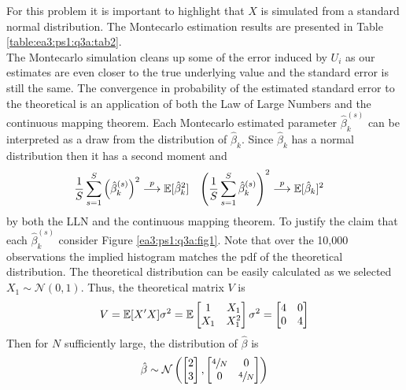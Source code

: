 \documentclass{article}
\begin{document}
\begin{solution}
For this problem it is important to highlight that $X$ is simulated from a standard normal distribution. The Montecarlo estimation results are presented in Table \ref{table:ea3:ps1:q3a:tab2}. 
 \\ 
The Montecarlo simulation cleans up some of the error induced by $U_i$ as our estimates are even closer to the true underlying value and the standard error is still the same. The convergence in probability of the estimated standard error to the theoretical is an application of both the Law of Large Numbers and the continuous mapping theorem. Each Montecarlo estimated parameter $\hat{\beta}_k^{(s)}$ can be interpreted as a draw from the distribution of $\hat{\beta}_k$. Since $\hat{\beta}_k$ has a normal distribution then it has a second moment and 
\begin{align*}
    \frac{1}{S} \sum_{s=1}^{S}\left(\hat{\beta}_{k}^{(s)}\right)^{2}&\stackrel{p}{\longrightarrow}  \mathbb{E}[\hat{\beta}_k^2] & 
    \left(\frac{1}{S} \sum_{s=1}^{S} \hat{\beta}_{k}^{(s)}\right)^{2}&\stackrel{p}{\longrightarrow} \mathbb{E}[\hat{\beta}_k]^2
\end{align*}
by both the LLN and the continuous mapping theorem. To justify the claim that each $\hat{\beta}_k^{(s)}$ consider Figure \ref{ea3:ps1:q3a:fig1}. Note that over the 10,000 observations the implied histogram matches the pdf of the theoretical distribution. The theoretical distribution can be easily calculated as we selected $X_1\sim\mathcal{N}(0,1)$. Thus, the theoretical matrix $V$ is 
\begin{equation*}
    V = \mathbb{E}[X'X]\sigma^2 = \mathbb{E}\begin{bmatrix}
    1 & X_1 \\ X_1 & X_1^2
    \end{bmatrix}\sigma^2 = 
    \begin{bmatrix}
    4 & 0 \\ 0 & 4
    \end{bmatrix} 
\end{equation*}
Then for $N$ sufficiently large, the distribution of $\hat{\beta}$ is 
\begin{equation*}
    \hat{\beta}\sim\mathcal{N}\left(\begin{bmatrix}
    2 \\ 3
    \end{bmatrix},\begin{bmatrix}
    \sfrac{4}{N} & 0 \\ 0 & \sfrac{4}{N}
    \end{bmatrix}\right)

\end{equation*}
\end{solution}
\end{document}
